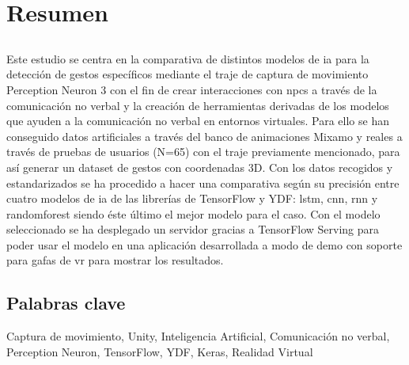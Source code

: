 \chapter*{Resumen}

\section*{\tituloPortadaVal}

Este estudio se centra en la comparativa de distintos modelos de \gls{ia} para la detección de gestos específicos mediante el traje de captura de movimiento Perception Neuron 3 con el fin de crear interacciones con \glspl{npc} a través de la comunicación no verbal y la creación de herramientas derivadas de los modelos que ayuden a la comunicación no verbal en entornos virtuales.
Para ello se han conseguido datos artificiales a través del banco de animaciones Mixamo y reales a través de pruebas de usuarios (N=65) con el traje previamente mencionado, para así generar un dataset de gestos con coordenadas 3D.
Con los datos recogidos y estandarizados se ha procedido a hacer una comparativa según su precisión entre cuatro modelos de \gls{ia} de las librerías de TensorFlow y YDF: \gls{lstm}, \gls{cnn}, \gls{rnn} y \gls{randomforest} siendo éste último el mejor modelo para el caso.
Con el modelo seleccionado se ha desplegado un servidor gracias a TensorFlow Serving para poder usar el modelo en una aplicación desarrollada a modo de demo con soporte para gafas de \gls{vr} para mostrar los resultados.


\section*{Palabras clave}

\noindent Captura de movimiento, Unity, Inteligencia Artificial, Comunicación no verbal, Perception Neuron, TensorFlow, YDF, Keras, Realidad Virtual




